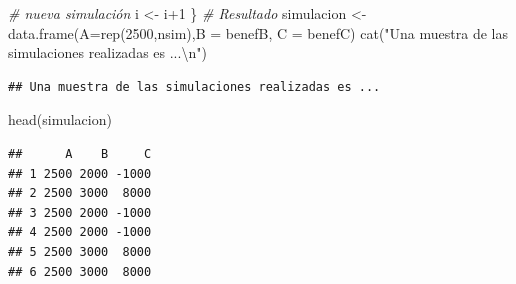 \documentclass[
]{book}
\newenvironment{Shaded}{\begin{snugshade}}{\end{snugshade}}
\newcommand{\AttributeTok}[1]{\textcolor[rgb]{0.77,0.63,0.00}{#1}}
\newcommand{\CommentTok}[1]{\textcolor[rgb]{0.56,0.35,0.01}{\textit{#1}}}
\newcommand{\DecValTok}[1]{\textcolor[rgb]{0.00,0.00,0.81}{#1}}
\newcommand{\FunctionTok}[1]{\textcolor[rgb]{0.00,0.00,0.00}{#1}}
\newcommand{\NormalTok}[1]{#1}
\newcommand{\OtherTok}[1]{\textcolor[rgb]{0.56,0.35,0.01}{#1}}
\newcommand{\SpecialCharTok}[1]{\textcolor[rgb]{0.00,0.00,0.00}{#1}}
\newcommand{\StringTok}[1]{\textcolor[rgb]{0.31,0.60,0.02}{#1}}
\theoremstyle{definition}
\theoremstyle{definition}
\theoremstyle{definition}
\theoremstyle{definition}
\theoremstyle{remark}
\begin{document}
\begin{Shaded}
\begin{Highlighting}[]
  \CommentTok{\# nueva simulación}
\NormalTok{  i }\OtherTok{\textless{}{-}}\NormalTok{ i}\SpecialCharTok{+}\DecValTok{1}
\NormalTok{\}}
\CommentTok{\# Resultado}
\NormalTok{simulacion }\OtherTok{\textless{}{-}} \FunctionTok{data.frame}\NormalTok{(}\AttributeTok{A=}\FunctionTok{rep}\NormalTok{(}\DecValTok{2500}\NormalTok{,nsim),}\AttributeTok{B =}\NormalTok{ benefB, }\AttributeTok{C =}\NormalTok{ benefC)}
\FunctionTok{cat}\NormalTok{(}\StringTok{"Una muestra de las simulaciones realizadas es ...}\SpecialCharTok{\textbackslash{}n}\StringTok{"}\NormalTok{)}
\end{Highlighting}
\end{Shaded}

\begin{verbatim}
## Una muestra de las simulaciones realizadas es ...
\end{verbatim}

\begin{Shaded}
\begin{Highlighting}[]
\FunctionTok{head}\NormalTok{(simulacion)}
\end{Highlighting}
\end{Shaded}

\begin{verbatim}
##      A    B     C
## 1 2500 2000 -1000
## 2 2500 3000  8000
## 3 2500 2000 -1000
## 4 2500 2000 -1000
## 5 2500 3000  8000
## 6 2500 3000  8000
\end{verbatim}

\begin{Shaded}
\end{Shaded}
\end{document}
